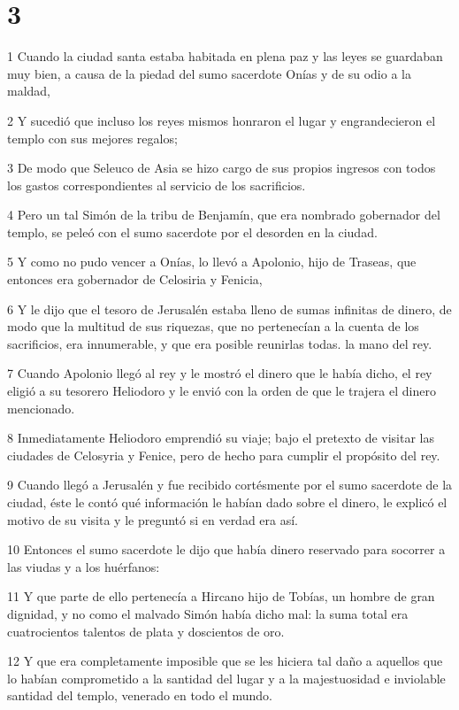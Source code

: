 \chapter{3}

\par 1 Cuando la ciudad santa estaba habitada en plena paz y las leyes se guardaban muy bien, a causa de la piedad del sumo sacerdote Onías y de su odio a la maldad,
\par 2 Y sucedió que incluso los reyes mismos honraron el lugar y engrandecieron el templo con sus mejores regalos;
\par 3 De modo que Seleuco de Asia se hizo cargo de sus propios ingresos con todos los gastos correspondientes al servicio de los sacrificios.
\par 4 Pero un tal Simón de la tribu de Benjamín, que era nombrado gobernador del templo, se peleó con el sumo sacerdote por el desorden en la ciudad.
\par 5 Y como no pudo vencer a Onías, lo llevó a Apolonio, hijo de Traseas, que entonces era gobernador de Celosiria y Fenicia,
\par 6 Y le dijo que el tesoro de Jerusalén estaba lleno de sumas infinitas de dinero, de modo que la multitud de sus riquezas, que no pertenecían a la cuenta de los sacrificios, era innumerable, y que era posible reunirlas todas. la mano del rey.
\par 7 Cuando Apolonio llegó al rey y le mostró el dinero que le había dicho, el rey eligió a su tesorero Heliodoro y le envió con la orden de que le trajera el dinero mencionado.
\par 8 Inmediatamente Heliodoro emprendió su viaje; bajo el pretexto de visitar las ciudades de Celosyria y Fenice, pero de hecho para cumplir el propósito del rey.
\par 9 Cuando llegó a Jerusalén y fue recibido cortésmente por el sumo sacerdote de la ciudad, éste le contó qué información le habían dado sobre el dinero, le explicó el motivo de su visita y le preguntó si en verdad era así.
\par 10 Entonces el sumo sacerdote le dijo que había dinero reservado para socorrer a las viudas y a los huérfanos:
\par 11 Y que parte de ello pertenecía a Hircano hijo de Tobías, un hombre de gran dignidad, y no como el malvado Simón había dicho mal: la suma total era cuatrocientos talentos de plata y doscientos de oro.
\par 12 Y que era completamente imposible que se les hiciera tal daño a aquellos que lo habían comprometido a la santidad del lugar y a la majestuosidad e inviolable santidad del templo, venerado en todo el mundo.
